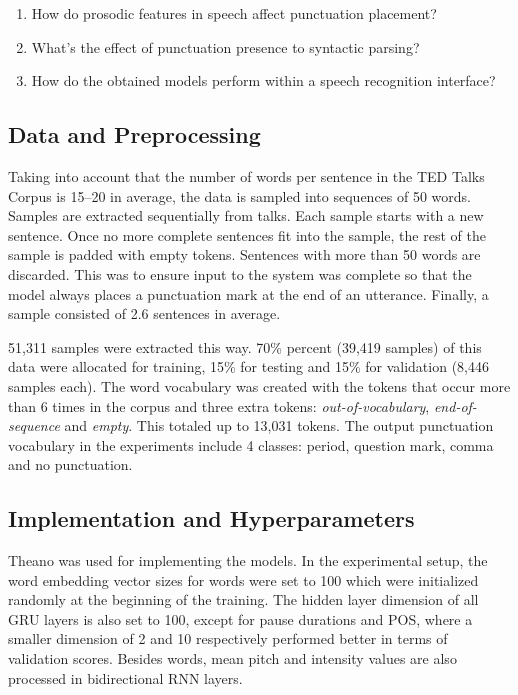 \begin{enumerate}
    \item How do prosodic features in speech affect punctuation placement?
    \item What's the effect of punctuation presence to syntactic parsing?
    \item How do the obtained models perform within a speech recognition interface?
\end{enumerate}

\subsection{Data and Preprocessing}
Taking into account that the number of words per sentence in the TED Talks Corpus is 15--20 in average, the data is sampled into sequences of 50 words. Samples are extracted sequentially from talks. Each sample starts with a new sentence. Once no more complete sentences fit into the sample, the rest of the sample is padded with empty tokens. Sentences with more than 50 words are discarded. This was to ensure input to the system was complete so that the model always places a punctuation mark at the end of an utterance. Finally, a sample consisted of 2.6 sentences in average.

51,311 samples were extracted this way. 70\% percent (39,419 samples) of this data were allocated for training, 15\% for testing and 15\% for validation (8,446 samples each). The word vocabulary was created with the tokens that occur more than 6 times in the corpus and three extra tokens: \textit{out-of-vocabulary}, \textit{end-of-sequence} and \textit{empty}. This totaled up to 13,031 tokens. The output punctuation vocabulary in the experiments include 4 classes: period, question mark, comma and no punctuation. 

\subsection{Implementation and Hyperparameters}
\label{punkProse:methodology:implementation}
Theano \citep{theano} was used for implementing the models. In the experimental setup, the word embedding vector sizes for words were set to 100 which were initialized randomly at the beginning of the training. The hidden layer dimension of all GRU layers is also set to 100, except for pause durations and POS, where a smaller dimension of 2 and 10 respectively performed better in terms of validation scores. Besides words, mean pitch and intensity values are also processed in bidirectional RNN layers. 

